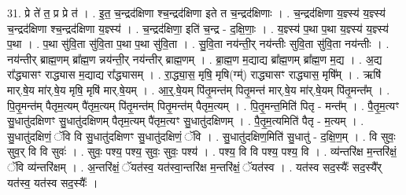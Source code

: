 \documentclass[17pt]{extarticle}
\begin{document}
31. प्रे ते॑ त॒ प्र प्रे त॑ । . इ॒त॒ च॒न्द्रद॑क्षिणा श्च॒न्द्रद॑क्षिणा इते त च॒न्द्रद॑क्षिणाः । . च॒न्द्रद॑क्षिणा य॒ज्ञ्स्य॑ य॒ज्ञ्स्य॑ च॒न्द्रद॑क्षिणा श्च॒न्द्रद॑क्षिणा य॒ज्ञ्स्य॑ । . च॒न्द्रद॑क्षिणा॒ इति॑ च॒न्द्र - द॒क्षि॒णाः॒ । . य॒ज्ञ्स्य॑ प॒था प॒था य॒ज्ञ्स्य॑ य॒ज्ञ्स्य॑ प॒था । . प॒था सु॑वि॒ता सु॑वि॒ता प॒था प॒था सु॑वि॒ता । . सु॒वि॒ता नय॑न्ती॒र् नय॑न्तीः सुवि॒ता सु॑वि॒ता नय॑न्तीः । . नय॑न्तीर् ब्राह्म॒णम् ब्रा᳚ह्म॒ण न्नय॑न्ती॒र् नय॑न्तीर् ब्राह्म॒णम् । . ब्रा॒ह्म॒ण म॒द्याद्य ब्रा᳚ह्म॒णम् ब्रा᳚ह्म॒ण म॒द्य । . अ॒द्य रा᳚द्ध्यासꣳ राद्ध्यास म॒द्याद्य रा᳚द्ध्यासम् । . रा॒द्ध्या॒स॒ मृषि॒ मृषि(ग्म्॑) राद्ध्यासꣳ राद्ध्यास॒ मृषि᳚म् । . ऋषि॑ मार्.षे॒य मा॑र्.षे॒य मृषि॒ मृषि॑ मार्.षे॒यम् । . आ॒र्॒.षे॒यम् पि॑तृ॒मन्त॑म् पितृ॒मन्त॑ मार्.षे॒य मा॑र्.षे॒यम् पि॑तृ॒मन्त᳚म् । . पि॒तृ॒मन्त॑म् पैतृम॒त्यम् पै॑तृम॒त्यम् पि॑तृ॒मन्त॑म् पितृ॒मन्त॑म् पैतृम॒त्यम् । . पि॒तृ॒मन्त॒मिति॑ पितृ - मन्त᳚म् । . पै॒तृ॒म॒त्यꣳ सु॒धातु॑दक्षिणꣳ सु॒धातु॑दक्षिणम् पैतृम॒त्यम् पै॑तृम॒त्यꣳ सु॒धातु॑दक्षिणम् । . पै॒तृ॒म॒त्यमिति॑ पैतृ - म॒त्यम् । . सु॒धातु॑दक्षिणं॒ ॅवि वि सु॒धातु॑दक्षिणꣳ सु॒धातु॑दक्षिणं॒ ॅवि । . सु॒धातु॑दक्षिण॒मिति॑ सु॒धातु॑ - द॒क्षि॒ण॒म् । . वि सुवः॒ सुव॒र् वि वि सुवः॑ । . सुवः॒ पश्य॒ पश्य॒ सुवः॒ सुवः॒ पश्य॑ । . पश्य॒ वि वि पश्य॒ पश्य॒ वि । . व्य॑न्तरि॑क्ष म॒न्तरि॑क्षं॒ ॅवि व्य॑न्तरि॑क्षम् । . अ॒न्तरि॑क्षं॒ ॅयत॑स्व॒ यत॑स्वा॒न्तरि॑क्ष म॒न्तरि॑क्षं॒ ॅयत॑स्व । . यत॑स्व सद॒स्यैः᳚ सद॒स्यै᳚र् यत॑स्व॒ यत॑स्व सद॒स्यैः᳚ । \newline
\end{document}
